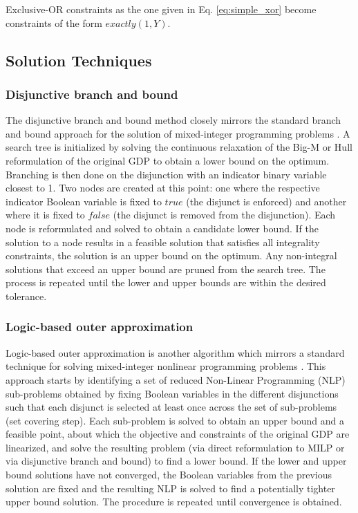\documentclass{juliacon}
\begin{document}
Exclusive-OR constraints as the one given in Eq. \eqref{eq:simple_xor} become constraints of the form $exactly(1,Y)$.
\vskip 6pt

\subsection{Solution Techniques}

\subsubsection{Disjunctive branch and bound}
The disjunctive branch and bound method closely mirrors the standard branch and bound approach for the solution of mixed-integer programming problems \cite{grossmann_lee_2003}. A search tree is initialized by solving the continuous relaxation of the Big-M or Hull reformulation of the original GDP to obtain a lower bound on the optimum. Branching is then done on the disjunction with an indicator binary variable closest to 1. Two nodes are created at this point: one where the respective indicator Boolean variable is fixed to $true$ (the disjunct is enforced) and another where it is fixed to $false$ (the disjunct is removed from the disjunction). Each node is reformulated and solved to obtain a candidate lower bound. If the solution to a node results in a feasible solution that satisfies all integrality constraints, the solution is an upper bound on the optimum. Any non-integral solutions that exceed an upper bound are pruned from the search tree. The process is repeated until the lower and upper bounds are within the desired tolerance.

\subsubsection{Logic-based outer approximation}
Logic-based outer approximation is another algorithm which mirrors a standard technique for solving mixed-integer nonlinear programming problems \cite{E.Grossmann2009}. This approach starts by identifying a set of reduced Non-Linear Programming (NLP) sub-problems obtained by fixing Boolean variables in the different disjunctions such that each disjunct is selected at least once across the set of sub-problems (set covering step). 
Each sub-problem is solved to obtain an upper bound and a feasible point, about which the objective and constraints of the original GDP are linearized, and solve the resulting problem (via direct reformulation to MILP or via disjunctive branch and bound) to find a lower bound. If the lower and upper bound solutions have not converged, the Boolean variables from the previous solution are fixed and the resulting NLP is solved to find a potentially tighter upper bound solution. The procedure is repeated until convergence is obtained.
\vskip 6pt
\end{document}
